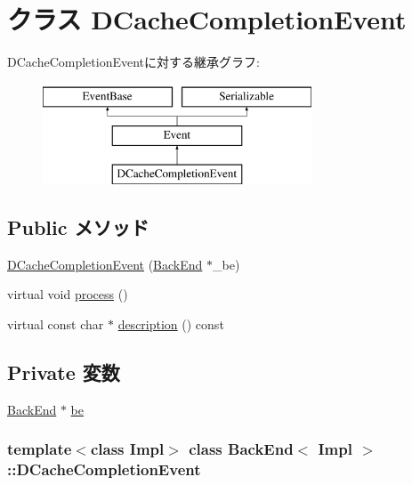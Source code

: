 \hypertarget{classBackEnd_1_1DCacheCompletionEvent}{
\section{クラス DCacheCompletionEvent}
\label{classBackEnd_1_1DCacheCompletionEvent}
}
DCacheCompletionEventに対する継承グラフ:\begin{figure}[H]
\begin{center}
\leavevmode
\includegraphics[height=3cm]{classBackEnd_1_1DCacheCompletionEvent}
\end{center}
\end{figure}
\subsection*{Public メソッド}
\begin{DoxyCompactItemize}
\item 
\hyperlink{classBackEnd_1_1DCacheCompletionEvent_a3448601dc7561a31778d913584e4fbae}{DCacheCompletionEvent} (\hyperlink{classBackEnd}{BackEnd} $\ast$\_\-be)
\item 
virtual void \hyperlink{classBackEnd_1_1DCacheCompletionEvent_a2e9c5136d19b1a95fc427e0852deab5c}{process} ()
\item 
virtual const char $\ast$ \hyperlink{classBackEnd_1_1DCacheCompletionEvent_a5a14fe478e2393ff51f02e9b7be27e00}{description} () const 
\end{DoxyCompactItemize}
\subsection*{Private 変数}
\begin{DoxyCompactItemize}
\item 
\hyperlink{classBackEnd}{BackEnd} $\ast$ \hyperlink{classBackEnd_1_1DCacheCompletionEvent_a84f815aa1fa864ba2e6d75f5ad2b52d1}{be}
\end{DoxyCompactItemize}
\subsubsection*{template$<$class Impl$>$ class BackEnd$<$ Impl $>$::DCacheCompletionEvent}



